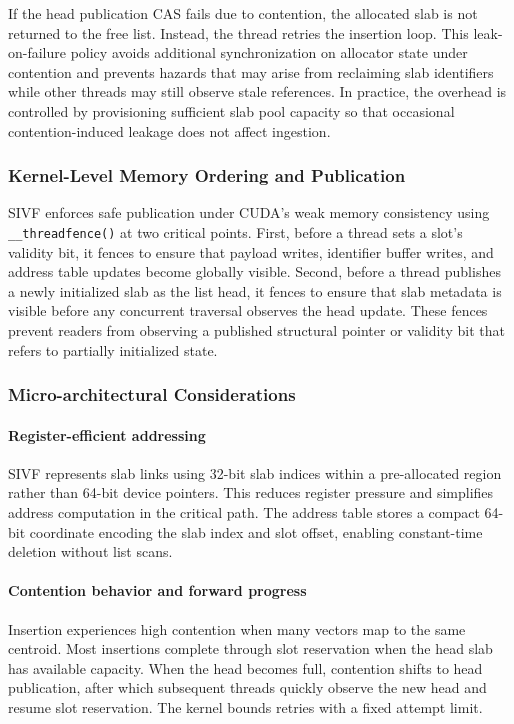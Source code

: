 \documentclass[sigconf,anonymous]{acmart}
\theoremstyle{plain}
\theoremstyle{definition}
\theoremstyle{remark}
\begin{document}
If the head publication CAS fails due to contention, the allocated slab is not returned to the free list. Instead, the thread retries the insertion loop. This leak-on-failure policy avoids additional synchronization on allocator state under contention and prevents hazards that may arise from reclaiming slab identifiers while other threads may still observe stale references. In practice, the overhead is controlled by provisioning sufficient slab pool capacity so that occasional contention-induced leakage does not affect ingestion.

\subsubsection{Kernel-Level Memory Ordering and Publication}
\label{sec:kernel_impl}

SIVF enforces safe publication under CUDA's weak memory consistency using \verb|__threadfence()| at two critical points. First, before a thread sets a slot's validity bit, it fences to ensure that payload writes, identifier buffer writes, and address table updates become globally visible. Second, before a thread publishes a newly initialized slab as the list head, it fences to ensure that slab metadata is visible before any concurrent traversal observes the head update. These fences prevent readers from observing a published structural pointer or validity bit that refers to partially initialized state.

\subsubsection{Micro-architectural Considerations}
\label{sub:micro_arch}

\paragraph{Register-efficient addressing}
SIVF represents slab links using 32-bit slab indices within a pre-allocated region rather than 64-bit device pointers. This reduces register pressure and simplifies address computation in the critical path. The address table stores a compact 64-bit coordinate encoding the slab index and slot offset, enabling constant-time deletion without list scans.

\paragraph{Contention behavior and forward progress}
Insertion experiences high contention when many vectors map to the same centroid. Most insertions complete through slot reservation when the head slab has available capacity. When the head becomes full, contention shifts to head publication, after which subsequent threads quickly observe the new head and resume slot reservation. The kernel bounds retries with a fixed attempt limit.
\end{document}
